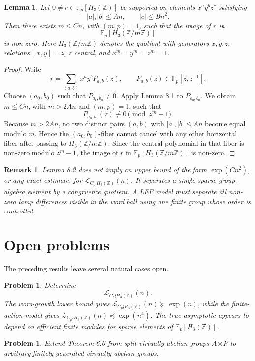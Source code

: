 \documentclass[11pt]{article}
\newcommand{\LEF}{\mathcal L}
\newcommand{\Z}{\mathbb Z}
\newcommand{\F}{\mathbb F}
\newtheorem{lemma}[theorem]{Lemma}
\newtheorem{problem}[theorem]{Problem}
\newtheorem{remark}[theorem]{Remark}
\begin{document}
\begin{lemma}
Let \(0\neq r\in\F_p[H_3(\Z)]\) be supported on elements \(x^ay^bz^c\) satisfying
\[
|a|,|b|\le An,\qquad |c|\le Bn^2.
\]
Then there exists \(m\le Cn\), with \((m,p)=1\), such that the image of \(r\) in
\[
\F_p[H_3(\Z/m\Z)]
\]
is non-zero. Here \(H_3(\Z/m\Z)\) denotes the quotient with generators \(x,y,z\), relations \([x,y]=z\), \(z\) central, and \(x^m=y^m=z^m=1\).
\end{lemma}

\begin{proof}
Write
\[
r=\sum_{(a,b)}x^ay^bP_{a,b}(z),\qquad P_{a,b}(z)\in\F_p[z,z^{-1}].
\]
Choose \((a_0,b_0)\) such that \(P_{a_0,b_0}\neq 0\). Apply Lemma 8.1 to \(P_{a_0,b_0}\). We obtain \(m\le Cn\), with \(m>2An\) and \((m,p)=1\), such that
\[
P_{a_0,b_0}(z)\not\equiv 0\pmod{z^m-1}.
\]
Because \(m>2An\), no two distinct pairs \((a,b)\) with \(|a|,|b|\le An\) become equal modulo \(m\). Hence the \((a_0,b_0)\)-fiber cannot cancel with any other horizontal fiber after passing to \(H_3(\Z/m\Z)\). Since the central polynomial in that fiber is non-zero modulo \(z^m-1\), the image of \(r\) in \(\F_p[H_3(\Z/m\Z)]\) is non-zero.
\end{proof}

\begin{remark}
Lemma 8.2 does not imply an upper bound of the form \(\exp(Cn^2)\), or any exact estimate, for \(\LEF_{C_p\wr H_3(\Z)}(n)\). It separates a single sparse group-algebra element by a congruence quotient. A LEF model must separate all non-zero lamp differences visible in the word ball using one finite group whose order is controlled.
\end{remark}

\section{Open problems}

The preceding results leave several natural cases open.

\begin{problem}
Determine
\[
\LEF_{C_p\wr H_3(\Z)}(n).
\]
The word-growth lower bound gives \(\LEF_{C_p\wr H_3(\Z)}(n)\succeq \exp(n)\), while the finite-action model gives \(\LEF_{C_p\wr H_3(\Z)}(n)\preceq \exp(n^4)\). The true asymptotic appears to depend on efficient finite modules for sparse elements of \(\F_p[H_3(\Z)]\).
\end{problem}

\begin{problem}
Extend Theorem 6.6 from split virtually abelian groups \(A\rtimes P\) to arbitrary finitely generated virtually abelian groups.
\end{problem}
\end{document}
